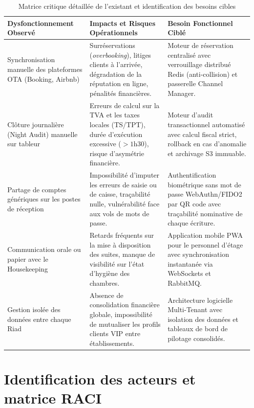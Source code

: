 \begin{table}[H]
\centering
\small
\renewcommand{\arraystretch}{1.3}
\begin{tabularx}{\textwidth}{|p{3.8cm}|p{4.2cm}|X|}
\hline
\textbf{Dysfonctionnement Observé} & \textbf{Impacts et Risques Opérationnels} & \textbf{Besoin Fonctionnel Ciblé} \\
\hline
Synchronisation manuelle des plateformes OTA (Booking, Airbnb) & Surréservations (\textit{overbooking}), litiges clients à l'arrivée, dégradation de la réputation en ligne, pénalités financières. & Moteur de réservation centralisé avec verrouillage distribué Redis (anti-collision) et passerelle Channel Manager. \\
\hline
Clôture journalière (Night Audit) manuelle sur tableur & Erreurs de calcul sur la TVA et les taxes locales (TS/TPT), durée d'exécution excessive ($> 1$h30), risque d'asymétrie financière. & Moteur d'audit transactionnel automatisé avec calcul fiscal strict, rollback en cas d'anomalie et archivage S3 immuable. \\
\hline
Partage de comptes génériques sur les postes de réception & Impossibilité d'imputer les erreurs de saisie ou de caisse, traçabilité nulle, vulnérabilité face aux vols de mots de passe. & Authentification biométrique sans mot de passe WebAuthn/FIDO2 par QR code avec traçabilité nominative de chaque écriture. \\
\hline
Communication orale ou papier avec le Housekeeping & Retards fréquents sur la mise à disposition des suites, manque de visibilité sur l'état d'hygiène des chambres. & Application mobile PWA pour le personnel d'étage avec synchronisation instantanée via WebSockets et RabbitMQ. \\
\hline
Gestion isolée des données entre chaque Riad & Absence de consolidation financière globale, impossibilité de mutualiser les profils clients VIP entre établissements. & Architecture logicielle Multi-Tenant avec isolation des données et tableaux de bord de pilotage consolidés. \\
\hline
\end{tabularx}
\caption{Matrice critique détaillée de l'existant et identification des besoins cibles}
\label{tab:critique_existant_detail}
\end{table}

\section{Identification des acteurs et matrice RACI}

